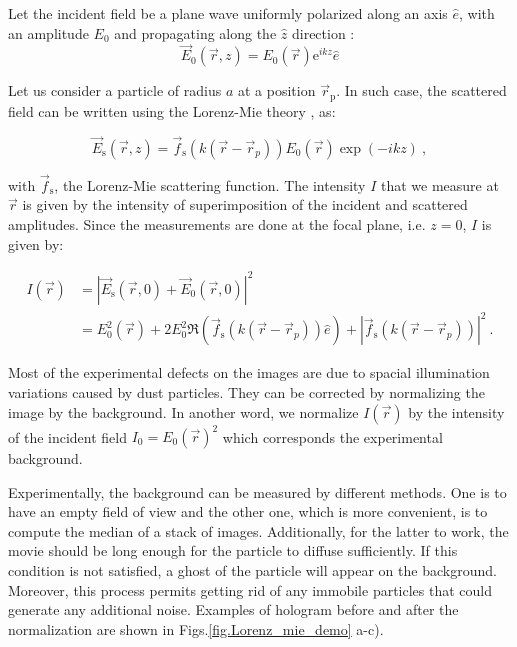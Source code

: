 Let the incident field be a plane wave uniformly polarized along an axis $ \hat{e}$, with an amplitude $E_0$ and propagating along the $\hat{z}$ direction :
\begin{equation}
	\vec{E}_0(\vec{r},z) = E_0(\vec{r}) \mathrm{e}^{ikz}\hat{e}
\end{equation}

Let us consider a particle of radius $a$ at a position $\vec{r}_\mathrm{p} $. In such case, the scattered field can be written using the Lorenz-Mie theory \cite{f_bohren_absorption_1998}, as:

\begin{equation}
	\vec{E}_\mathrm{s}(\vec{r}, z) =  \vec{f}_\mathrm{s}(k(\vec{r} - \vec{r}_p))E_0(\vec{r}) \exp \left(-ikz\right) ~,
	\label{EMie}
\end{equation} 

with $\vec{f}_\mathrm{s}$, the Lorenz-Mie scattering function. The intensity $I$ that we measure at $\vec{r}$ is given by the intensity of superimposition of the incident and scattered amplitudes. Since the measurements are done at the focal plane, i.e. $z = 0 $, $I$ is given by:

\begin{equation}
	\begin{aligned}
	I(\vec{r}) & = |\vec{E}_\mathrm{s}(\vec{r}, 0) + \vec{E}_0(\vec{r}, 0)|^2 \\
	& = E_0^2(\vec{r}) + 2 E_0^2\Re \left(\vec{f}_\mathrm{s}(k(\vec{r}- \vec{r}_p)) \hat{e}\right) + | \vec{f}_\mathrm{s}(k(\vec{r}- \vec{r}_p)) |^2 ~.
	\end{aligned}
\end{equation}

Most of the experimental defects on the images are due to spacial illumination variations caused by dust particles. They can be corrected by normalizing the image by the background. In another word, we normalize $I(\vec{r})$ by the intensity of the incident field $I_0 = E_0(\vec{r})^2$ which corresponds the experimental background. 

Experimentally, the background can be measured by different methods. One is to have an empty field of view and the other one, which is more convenient, is to compute the median of a stack of images. Additionally, for the latter to work, the movie should be long enough for the particle to diffuse sufficiently. If this condition is not satisfied, a ghost of the particle will appear on the background. Moreover, this process permits getting rid of any immobile particles that could generate any additional noise. Examples of hologram before and after the normalization are shown in Figs.\ref{fig.Lorenz_mie_demo} a-c).

